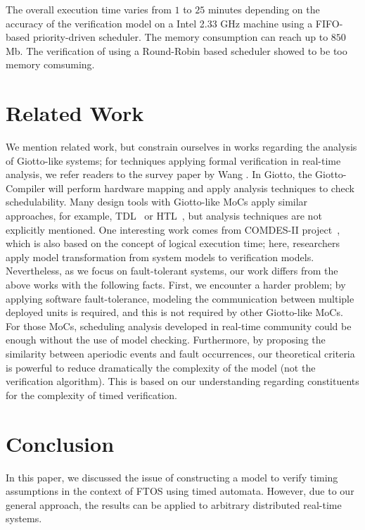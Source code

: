 \documentclass[10pt, a4paper, onecolumn, conference, compsocconf]{IEEEtran}
\begin{document}
The overall execution time varies from $1$ to $25$ minutes depending on the accuracy of the verification model on a Intel 2.33 GHz machine using a FIFO-based priority-driven scheduler. The  memory consumption can reach up to $850$Mb. The verification of using a Round-Robin based scheduler showed to be too memory comsuming.

\section{Related Work\label{sec.Related.Work}}
We mention related work, but constrain ourselves in works regarding the analysis of Giotto-like systems; for techniques applying formal verification
in real-time analysis, we refer readers to the survey paper by Wang \cite{wang2004fvt}.
In Giotto, the Giotto-Compiler will perform hardware mapping and apply analysis techniques to check schedulability.
Many design tools with Giotto-like MoCs apply similar approaches, for example, TDL~\cite{simmons:1998:tdl} or HTL~\cite{ghosal:2006:htl}, but
analysis techniques are not explicitly mentioned.
One interesting work comes from COMDES-II project~\cite{ke2008vci}, which is also based on the concept of logical execution time; here, researchers apply model transformation from system models to verification models.
Nevertheless, as we focus on fault-tolerant systems, our work differs from the above works with the following facts.
First, we encounter a harder problem; by applying software fault-tolerance, modeling the communication between multiple deployed
units is required, and this is not required by other Giotto-like MoCs.
For those MoCs, scheduling analysis developed in real-time community could be enough without the use of model checking.
Furthermore, by proposing the similarity between aperiodic events and fault occurrences, our theoretical criteria is powerful to
reduce dramatically the complexity of the model (not the verification algorithm). This is based on our understanding regarding constituents
for the complexity of timed verification.

\section{Conclusion\label{sec.Conclusion}}

In this paper, we discussed the issue of constructing a model to verify timing assumptions in the context of FTOS using timed automata. However, due to our general approach, the results can be applied to arbitrary distributed real-time systems.
\end{document}
